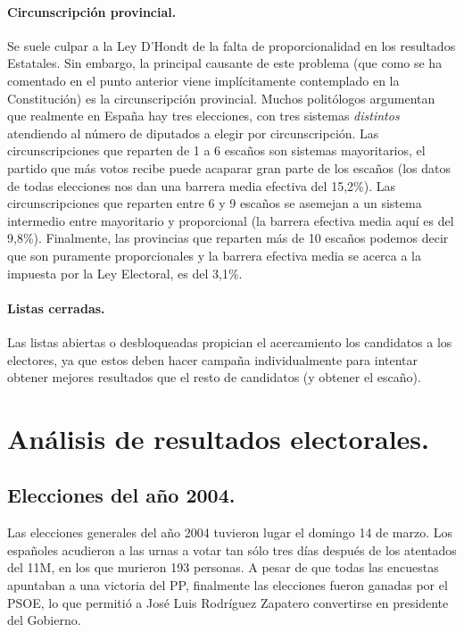 \documentclass[11pt]{article}
\begin{document}
	\paragraph{Circunscripción provincial.}
	
	Se suele culpar a la Ley D'Hondt de la falta de proporcionalidad en los resultados Estatales. Sin embargo, la principal causante de este problema (que como se ha comentado en el punto anterior viene implícitamente contemplado en la Constitución) es la circunscripción provincial. Muchos politólogos argumentan que realmente en España hay tres elecciones, con tres sistemas \textit{distintos} atendiendo al número de diputados a elegir por circunscripción. Las circunscripciones que reparten de 1 a 6 escaños son sistemas mayoritarios, el partido que más votos recibe puede acaparar gran parte de los escaños (los datos de todas elecciones nos dan una barrera media efectiva del 15,2\%). Las circunscripciones que reparten entre 6 y 9 escaños se asemejan a un sistema intermedio entre mayoritario y proporcional (la barrera efectiva media aquí es del 9,8\%). Finalmente, las provincias que reparten más de 10 escaños podemos decir que son puramente proporcionales y la barrera efectiva media se acerca a la impuesta por la Ley Electoral, es del 3,1\%.
	
	\paragraph{Listas cerradas.}
	
	Las listas abiertas o desbloqueadas propician el acercamiento los candidatos a los electores, ya que estos deben hacer campaña individualmente para intentar obtener mejores resultados que el resto de candidatos (y obtener el escaño).
	
	
	
	\newpage
	
	\section{Análisis de resultados electorales.}
	\subsection{Elecciones del año 2004.}
	
	Las elecciones generales del año 2004 tuvieron lugar el domingo 14 de marzo. Los españoles acudieron a las urnas a votar tan sólo tres días después de los atentados del 11M, en los que murieron 193 personas. A pesar de que todas las encuestas apuntaban a una victoria del PP, finalmente las elecciones fueron ganadas por el PSOE, lo que permitió a José Luis Rodríguez Zapatero convertirse en presidente del Gobierno.
	
\end{document}
